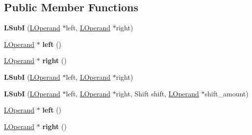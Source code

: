 \subsection*{Public Member Functions}
\begin{DoxyCompactItemize}
\item 
{\bfseries L\+SubI} (\hyperlink{classv8_1_1internal_1_1_l_operand}{L\+Operand} $\ast$left, \hyperlink{classv8_1_1internal_1_1_l_operand}{L\+Operand} $\ast$right)\hypertarget{classv8_1_1internal_1_1_l_sub_i_a75f1f02353b512f0b1935b3d96f4eec3}{}\label{classv8_1_1internal_1_1_l_sub_i_a75f1f02353b512f0b1935b3d96f4eec3}

\item 
\hyperlink{classv8_1_1internal_1_1_l_operand}{L\+Operand} $\ast$ {\bfseries left} ()\hypertarget{classv8_1_1internal_1_1_l_sub_i_afbf9705ee2ec86b3621f7ec767461707}{}\label{classv8_1_1internal_1_1_l_sub_i_afbf9705ee2ec86b3621f7ec767461707}

\item 
\hyperlink{classv8_1_1internal_1_1_l_operand}{L\+Operand} $\ast$ {\bfseries right} ()\hypertarget{classv8_1_1internal_1_1_l_sub_i_ac586b742ba643b32b6709c89feab5c2c}{}\label{classv8_1_1internal_1_1_l_sub_i_ac586b742ba643b32b6709c89feab5c2c}

\item 
{\bfseries L\+SubI} (\hyperlink{classv8_1_1internal_1_1_l_operand}{L\+Operand} $\ast$left, \hyperlink{classv8_1_1internal_1_1_l_operand}{L\+Operand} $\ast$right)\hypertarget{classv8_1_1internal_1_1_l_sub_i_a75f1f02353b512f0b1935b3d96f4eec3}{}\label{classv8_1_1internal_1_1_l_sub_i_a75f1f02353b512f0b1935b3d96f4eec3}

\item 
{\bfseries L\+SubI} (\hyperlink{classv8_1_1internal_1_1_l_operand}{L\+Operand} $\ast$left, \hyperlink{classv8_1_1internal_1_1_l_operand}{L\+Operand} $\ast$right, Shift shift, \hyperlink{classv8_1_1internal_1_1_l_operand}{L\+Operand} $\ast$shift\+\_\+amount)\hypertarget{classv8_1_1internal_1_1_l_sub_i_ac4457a5de02f659725e21c156a52134c}{}\label{classv8_1_1internal_1_1_l_sub_i_ac4457a5de02f659725e21c156a52134c}

\item 
\hyperlink{classv8_1_1internal_1_1_l_operand}{L\+Operand} $\ast$ {\bfseries left} ()\hypertarget{classv8_1_1internal_1_1_l_sub_i_afbf9705ee2ec86b3621f7ec767461707}{}\label{classv8_1_1internal_1_1_l_sub_i_afbf9705ee2ec86b3621f7ec767461707}

\item 
\hyperlink{classv8_1_1internal_1_1_l_operand}{L\+Operand} $\ast$ {\bfseries right} ()\hypertarget{classv8_1_1internal_1_1_l_sub_i_ac586b742ba643b32b6709c89feab5c2c}{}\label{classv8_1_1internal_1_1_l_sub_i_ac586b742ba643b32b6709c89feab5c2c}


\end{DoxyCompactItemize}
